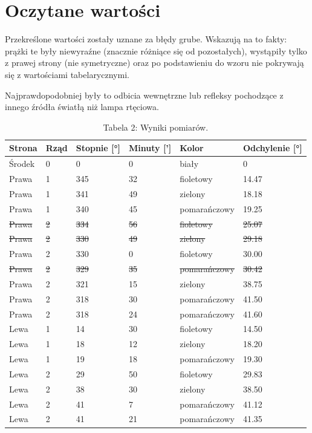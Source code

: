 \documentclass{fizykalab}
\begin{document}
{\section*{Oczytane wartości}
\par
Przekreślone wartości zostały uznane za błędy grube. Wskazują na to fakty: prążki te były niewyraźne (znacznie różniące się od pozostałych), wystąpiły tylko z prawej strony (nie symetryczne) oraz po podstawieniu do wzoru nie pokrywają się z wartościami tabelarycznymi.

Najprawdopodobniej były to odbicia wewnętrzne lub refleksy pochodzące z innego źródła światłą niż lampa rtęciowa.
\begin{table}[H]
	\centering
\begin{tabular}{|l|l|l|l|l|l|}
	\hline
	\rule{0pt}{1em} \textbf{Strona} & \textbf{Rząd} & \textbf{Stopnie [°]} & \textbf{Minuty [']} & \textbf{Kolor} & \textbf{Odchylenie [°]} \\ \hline\hline
	\rule{0pt}{1em} Środek & 0 & 0 & 0 & biały & 0 \\ \hline\hline
	\rule{0pt}{1em} Prawa & 1 & 345 & 32 & fioletowy & 14.47 \\ \hline
	\rule{0pt}{1em} Prawa & 1 & 341 & 49 & zielony & 18.18 \\ \hline
	\rule{0pt}{1em} Prawa & 1 & 340 & 45 & pomarańczowy & 19.25 \\ \hline
	\rule{0pt}{1em} \st{Prawa} & \st{2} & \st{334} & \st{56} & \st{fioletowy} & \st{25.07} \\ \hline
	\rule{0pt}{1em} \st{Prawa} & \st{2} & \st{330} & \st{49} & \st{zielony} & \st{29.18} \\ \hline
	\rule{0pt}{1em} Prawa & 2 & 330 & 0 & fioletowy & 30.00 \\ \hline
	\rule{0pt}{1em} \st{Prawa} & \st{2} & \st{329} & \st{35} & \st{pomarańczowy} & \st{30.42} \\ \hline
	\rule{0pt}{1em} Prawa & 2 & 321 & 15 & zielony & 38.75 \\ \hline
	\rule{0pt}{1em} Prawa & 2 & 318 & 30 & pomarańczowy & 41.50 \\ \hline
	\rule{0pt}{1em} Prawa & 2 & 318 & 24 & pomarańczowy & 41.60 \\ \hline\hline
	\rule{0pt}{1em} Lewa & 1 & 14 & 30 & fioletowy & 14.50 \\ \hline
	\rule{0pt}{1em} Lewa & 1 & 18 & 12 & zielony & 18.20 \\ \hline
	\rule{0pt}{1em} Lewa & 1 & 19 & 18 & pomarańczowy & 19.30 \\ \hline
	\rule{0pt}{1em} Lewa & 2 & 29 & 50 & fioletowy & 29.83 \\ \hline
	\rule{0pt}{1em} Lewa & 2 & 38 & 30 & zielony & 38.50 \\ \hline
	\rule{0pt}{1em} Lewa & 2 & 41 & 7 & pomarańczowy & 41.12 \\ \hline
	\rule{0pt}{1em} Lewa & 2 & 41 & 21 & pomarańczowy & 41.35 \\ \hline
\end{tabular}
	\caption*{Tabela 2: Wyniki pomiarów.}
\end{table}

}
\end{document}
